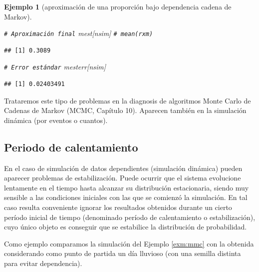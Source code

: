 \documentclass[
]{book}
\newenvironment{Shaded}{\begin{snugshade}}{\end{snugshade}}
\newcommand{\CommentTok}[1]{\textcolor[rgb]{0.56,0.35,0.01}{\textit{#1}}}
\newcommand{\NormalTok}[1]{#1}
\theoremstyle{break}
\newtheorem{example}{Ejemplo}[chapter]
\theoremstyle{nonumberplain}
\renewcommand{\CommentTok}[1]{\textcolor[rgb]{0.41,0.41,0.41}{\texttt{#1}}}
\begin{document}
\begin{example}[aproximación de una proporción bajo dependencia cadena de Markov]
\begin{Shaded}
\begin{Highlighting}[]
\CommentTok{\# Aproximación final}
\NormalTok{mest[nsim] }\CommentTok{\# mean(rxm)}
\end{Highlighting}
\end{Shaded}

\begin{verbatim}
## [1] 0.3089
\end{verbatim}

\begin{Shaded}
\begin{Highlighting}[]
\CommentTok{\# Error estándar}
\NormalTok{mesterr[nsim]}
\end{Highlighting}
\end{Shaded}

\begin{verbatim}
## [1] 0.02403491
\end{verbatim}

\end{example}

Trataremos este tipo de problemas en la diagnosis de algoritmos Monte Carlo de Cadenas de Markov (MCMC, Capítulo 10).
Aparecen también en la simulación dinámica (por eventos o cuantos).

\hypertarget{periodo-de-calentamiento}{%
\subsection{Periodo de calentamiento}\label{periodo-de-calentamiento}}

En el caso de simulación de datos dependientes (simulación dinámica)
pueden aparecer problemas de estabilización. Puede ocurrir que el sistema
evolucione lentamente en el tiempo hasta alcanzar su distribución estacionaria,
siendo muy sensible a las condiciones iniciales con las que se comienzó la
simulación. En tal caso resulta conveniente ignorar los resultados obtenidos
durante un cierto período inicial de tiempo (denominado período de calentamiento
o estabilización), cuyo único objeto es conseguir que se estabilice la distribución de
probabilidad.

Como ejemplo comparamos la simulación del Ejemplo \ref{exm:mmc} con la obtenida considerando como punto de partida un día lluvioso (con una semilla distinta para evitar dependencia).
\end{document}
